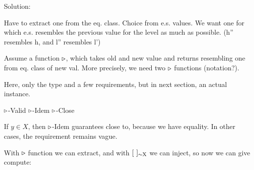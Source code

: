 
Solution:

%
%

Have to extract one from the eq. class. Choice from e.s. values. We want one for which e.s. resembles the previous value for the level as much as possible. (h'' resembles h, and l'' resembles l')

Assume a function $\triangleright$, which takes old and new value and returns resembling one from eq. class of new val. More precisely, we need two $\triangleright$ functions (notation?).


Here, only the type and a few requirements, but in next section, an actual instance.


						{$\triangleright$-Valid} 
				{$\triangleright$-Idem} 
	{$\triangleright$-Close} 

If $y \in X$, then {\sc $\triangleright$-Idem} guarantees close to, because we have equality. In other cases, the requirement remains vague.


With $\triangleright$ function we can extract, and with $[\,{}\,]_{\sim {\mathrm X}}$ we can inject, so now we can give compute:


